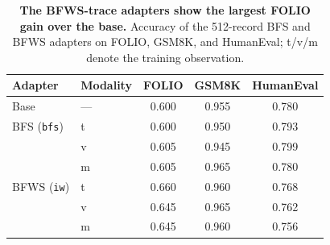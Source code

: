 \begin{table}[t]
\caption{\textbf{The BFWS-trace adapters show the largest FOLIO gain over the base.} Accuracy of the 512-record BFS and BFWS adapters on FOLIO, GSM8K, and HumanEval; t/v/m denote the training observation.}
\label{tab:results-transfer}
\centering\footnotesize
\setlength{\tabcolsep}{5pt}
\begin{tabular}{@{}llccc@{}}
\toprule[0.4mm]
\rowcolor{mygray}\textbf{Adapter} & \textbf{Modality} & \textbf{FOLIO} & \textbf{GSM8K} & \textbf{HumanEval} \\
\midrule
Base & --- & 0.600 & 0.955 & 0.780 \\
\midrule
BFS (\texttt{bfs}) & t & 0.600 & 0.950 & 0.793 \\
 & v & 0.605 & 0.945 & 0.799 \\
 & m & 0.605 & 0.965 & 0.780 \\
\midrule
BFWS (\texttt{iw}) & t & 0.660 & 0.960 & 0.768 \\
 & v & 0.645 & 0.965 & 0.762 \\
 & m & 0.645 & 0.960 & 0.756 \\
\bottomrule
\end{tabular}
\end{table}

